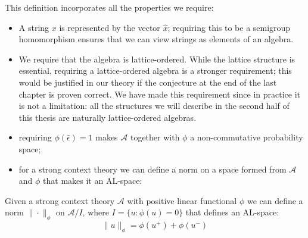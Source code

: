This definition incorporates all the properties we require:
\begin{itemize}
\item A string $x$ is represented by the vector $\hat{x}$; requiring this to be a semigroup homomorphism ensures that we can view strings as elements of an algebra.
\item We require that the algebra is lattice-ordered. While the lattice structure is essential, requiring a lattice-ordered algebra is a stronger requirement; this would be justified in our theory if the conjecture at the end of the last chapter is proven correct. We have made this requirement since in practice it is not a limitation: all the structures we will describe in the second half of this thesis are naturally lattice-ordered algebras.
\item requiring $\phi(\hat{\epsilon}) = 1$  makes $\mathcal{A}$ together with $\phi$ a non-commutative probability space;
\item for a strong context theory we can define a norm on a space formed from $\mathcal{A}$ and $\phi$ that makes it an AL-space:
\end{itemize}
\begin{prop}
Given a strong context theory $\mathcal{A}$ with positive linear functional $\phi$ we can define a norm $\|\cdot\|_\phi$ on $\mathcal{A}/I$, where $I = \{u : \phi(u) = 0\}$ that defines an AL-space:
$$\|u\|_\phi = \phi(u^+) + \phi(u^-)$$
\end{prop}
